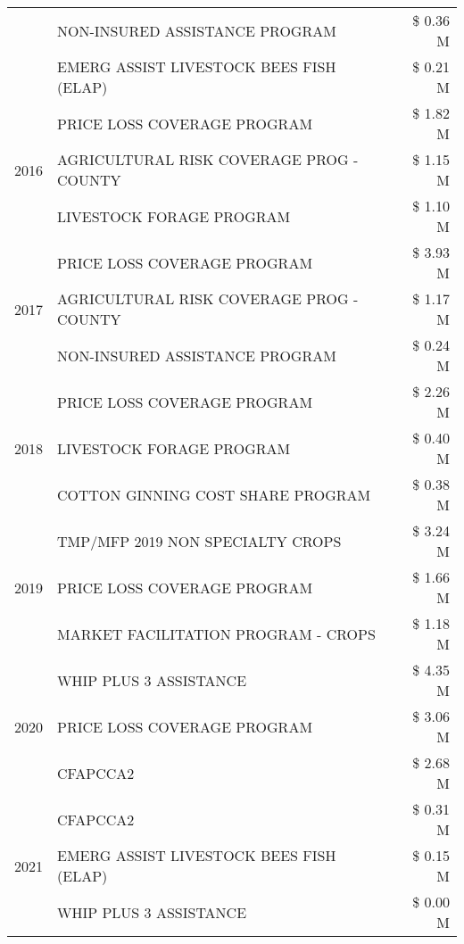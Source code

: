 \begin{tabular}{llr}
 & NON-INSURED ASSISTANCE PROGRAM & \$ 0.36 M \\
 & EMERG ASSIST LIVESTOCK BEES FISH (ELAP) & \$ 0.21 M \\
\cline{1-3}
\multirow[t]{3}{*}{2016} & PRICE LOSS COVERAGE PROGRAM & \$ 1.82 M \\
 & AGRICULTURAL RISK COVERAGE PROG - COUNTY & \$ 1.15 M \\
 & LIVESTOCK FORAGE PROGRAM & \$ 1.10 M \\
\cline{1-3}
\multirow[t]{3}{*}{2017} & PRICE LOSS COVERAGE PROGRAM & \$ 3.93 M \\
 & AGRICULTURAL RISK COVERAGE PROG - COUNTY & \$ 1.17 M \\
 & NON-INSURED ASSISTANCE PROGRAM & \$ 0.24 M \\
\cline{1-3}
\multirow[t]{3}{*}{2018} & PRICE LOSS COVERAGE PROGRAM & \$ 2.26 M \\
 & LIVESTOCK FORAGE PROGRAM & \$ 0.40 M \\
 & COTTON GINNING COST SHARE PROGRAM & \$ 0.38 M \\
\cline{1-3}
\multirow[t]{3}{*}{2019} & TMP/MFP 2019 NON SPECIALTY CROPS & \$ 3.24 M \\
 & PRICE LOSS COVERAGE PROGRAM & \$ 1.66 M \\
 & MARKET FACILITATION PROGRAM - CROPS & \$ 1.18 M \\
\cline{1-3}
\multirow[t]{3}{*}{2020} & WHIP PLUS 3 ASSISTANCE & \$ 4.35 M \\
 & PRICE LOSS COVERAGE PROGRAM & \$ 3.06 M \\
 & CFAPCCA2 & \$ 2.68 M \\
\cline{1-3}
\multirow[t]{3}{*}{2021} & CFAPCCA2 & \$ 0.31 M \\
 & EMERG ASSIST LIVESTOCK BEES FISH (ELAP) & \$ 0.15 M \\
 & WHIP PLUS 3 ASSISTANCE & \$ 0.00 M \\
\cline{1-3}
\bottomrule
\end{tabular}
